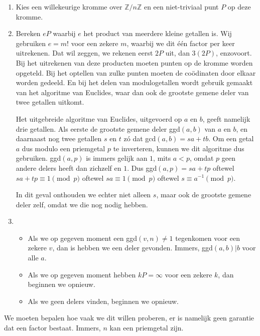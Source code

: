 \documentclass{article}
\begin{document}
\begin{enumerate}

	\item Kies een willekeurige kromme over $\mathbb{Z}/n\mathbb{Z}$ en een niet-triviaal punt $P$ op deze kromme.

	\item Bereken $eP$ waarbij $e$ het product van meerdere kleine getallen is. Wij gebruiken $e = m!$ voor een zekere $m$, waarbij we dit \'e\'en factor per keer uitrekenen. Dat wil zeggen, we rekenen  eerst $2P$ uit, dan $3(2P)$, enzovoort. Bij het 		uitrekenen van deze producten moeten punten op de kromme worden opgeteld. Bij het optellen van zulke punten moeten de co\"odinaten door elkaar worden gedeeld. En bij het delen van modulogetallen wordt gebruik gemaakt van het algoritme van Euclides, waar dan ook de grootste gemene deler van twee getallen uitkomt.

	Het uitgebreide algoritme van Euclides, uitgevoerd op $a$ en $b$, geeft namelijk drie getallen. Als eerste de grootste gemene deler ggd$(a, b)$ van $a$ en $b$, en daarnaast nog twee getallen $s$ en $t$ z\'o dat gcd$(a, b) = s a + t b$. Om een getal $a$ 	dus modulo een priemgetal $p$ te inverteren, kunnen we dit algoritme dus gebruiken. ggd$(a, p)$ is immers gelijk aan $1$, mits $a < p$, omdat $p$ geen andere delers heeft dan zichzelf en $1$. Dus ggd$(a, p) = sa + tp$ oftewel $sa + tp \equiv 1 \pmod{p}$ 
oftewel $sa \equiv 1 \pmod{p}$ oftewel $s \equiv a^{-1} \pmod{p}$.

	In dit geval onthouden we echter niet alleen $s$, maar ook de grootste gemene deler zelf, omdat we die nog nodig hebben.

	\item 
	\begin{itemize}
		\item Als we op gegeven moment een ggd$(v, n) \neq 1$ tegenkomen voor een zekere $v$, dan is hebben we een deler gevonden. Immers, ggd$(a, b) \vert b$ voor alle $a$.
		\item Als we op gegeven moment hebben $kP = \infty$ voor een zekere $k$, dan beginnen we opnieuw.
		\item Als we geen delers vinden, beginnen we opnieuw.
	\end{itemize}
\end{enumerate}

We moeten bepalen hoe vaak we dit willen proberen, er is namelijk geen garantie dat een factor bestaat. Immers, $n$ kan een priemgetal zijn.
\end{document}
